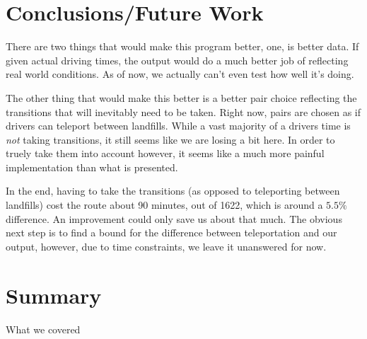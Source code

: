 \documentclass{beamer}
\begin{document}
\section{Conclusions/Future Work} 
\begin{frame}
There are two things that would make this program better, one, is better data. If given actual driving times, the output would do a much better job of reflecting real world conditions. As of now, we actually can't even test how well it's doing.

The other thing that would make this better is a better pair choice reflecting the transitions that will inevitably need to be taken. Right now, pairs are chosen as if drivers can teleport between landfills. While a vast majority of a drivers time is \emph{not} taking transitions, it still seems like we are losing a bit here. In order to truely take them into account however, it seems like a much more painful implementation than what is presented. 

In the end, having to take the transitions (as opposed to teleporting between landfills) cost the route about 90 minutes, out of 1622, which is around a $5.5\%$ difference. An improvement could only save us about that much. The obvious next step is to find a bound for the difference between teleportation and our output, however, due to time constraints, we leave it unanswered for now.
\end{frame}

\section*{Summary}
\begin{frame}{What we covered}
\begin{multicols}{2}
	\tableofcontents
\end{multicols}
\end{frame}
\end{document}
